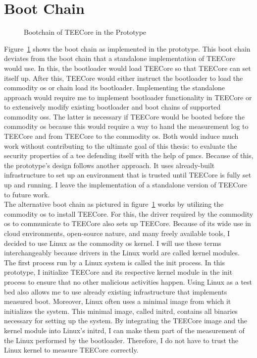 \section{Boot Chain}
\label{sec:30:tee_boot_chain}
\begin{figure}
  \begin{center}
    
    \caption{Bootchain of TEECore in the Prototype}
    \label{fig:30:tee_bootchain}
  \end{center}
\end{figure}
Figure~\ref{fig:30:tee_bootchain} shows the boot chain as implemented in the
prototype. This boot chain deviates from the boot chain that a standalone
implementation of TEECore would use. In this, the bootloader would load TEECore
so that TEECore can set itself up. After this, TEECore would either instruct the
bootloader to load the commodity \gls{os} or chain load its bootloader.
Implementing the standalone approach would require me to implement bootloader
functionality in TEECore or to extensively modify existing bootloader and boot
chains of supported commodity \glspl{os}. The latter is necessary if TEECore
would be booted before the commodity \gls{os} because this would require a way
to hand the measurement log to TEECore and from TEECore to the commodity
\gls{os}. Both would induce much work without contributing to the ultimate goal
of this thesis: to evaluate the security properties of a \gls{tee} defending
itself with the help of \glspl{pmc}. Because of this, the prototype's design
follows another approach. It uses already-built infrastructure to set up an
environment that is trusted until TEECore is fully set up and running. I leave
the implementation of a standalone version of TEECore to future work.\\

The alternative boot chain as pictured in figure~\ref{fig:30:tee_bootchain}
works by utilizing the commodity \gls{os} to install TEECore. For this, the
driver required by the commodity \gls{os} to communicate to TEECore also sets up
TEECore. Because of its wide use in cloud environments, open-source nature, and
many freely available tools, I decided to use Linux as the commodity \gls{os}
kernel. I will use these terms interchangeably because drivers in the Linux
world are called kernel modules. The first process run by a Linux system is
called the init process. In this prototype, I initialize TEECore and its
respective kernel module in the init process to ensure that no other malicious
activities happen. Using Linux as a test bed also allows me to use already
existing infrastructure that implements measured boot. Moreover, Linux often
uses a minimal image from which it initializes the system. This minimal image,
called initrd, contains all binaries necessary for setting up the system. By
integrating the TEECore image and the kernel module into Linux's initrd, I can
make them part of the measurement of the Linux performed by the bootloader.
Therefore, I do not have to trust the Linux kernel to measure TEECore correctly.
\\

